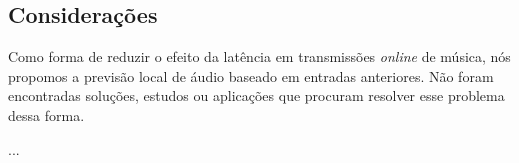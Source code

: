\subsection{Considerações}

Como forma de reduzir o efeito da latência em transmissões \textit{online} de música, nós propomos a previsão local de áudio baseado em entradas anteriores. Não foram encontradas soluções, estudos ou aplicações que procuram resolver esse problema dessa forma.

...
